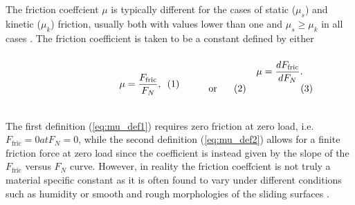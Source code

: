 The friction coeffcient $\mu$ is typically different for the cases of static ($\mu_s$)
and kinetic ($\mu_k$) friction, usually both with values lower than one and $\mu_s \ge \mu_k$ in all cases \cite[p. 6]{gnecco_meyer_2015}. The friction coefficient is taken to be a constant defined by either \cite{gao_frictional_2004} \\
\vspace{0.1cm}
\begin{subequations}
\noindent\begin{minipage}{.2\linewidth}
  \hfill
\end{minipage}
\begin{minipage}[b]{0.2\linewidth}
  \begin{align}
    \mu = \frac{F_{\text{fric}}}{F_N},
    \label{eq:mu_def1}
  \end{align}
\end{minipage}
\begin{minipage}[b]{0.2\linewidth}
  \begin{align*}
    \text{or}
  \end{align*}
\end{minipage}
\begin{minipage}[b]{0.2\linewidth}
  \begin{align}
    \mu = \frac{dF_{\text{fric}}}{dF_N}.
    \label{eq:mu_def2}
  \end{align}
\end{minipage}
\begin{minipage}{.2\linewidth}
\end{minipage}
\label{eq:mu_def}
\end{subequations}
\vspace{0.1cm}
\\
\noindent The first definition (\cref{eq:mu_def1}) requires zero friction at zero load, i.e.\ $F_{\text{fric}} = 0 at F_N = 0$, while the second definition (\cref{eq:mu_def2}) allows for a finite friction force at zero load since the coefficient is instead given by the slope of the $F_{\text{fric}}$ versus $F_N$ curve. However, in reality the friction coeffcient is not truly a material specific constant as it is often found to vary under different conditions such as humidity or smooth and rough morphologies of the sliding surfaces \cite{gao_frictional_2004}. 




